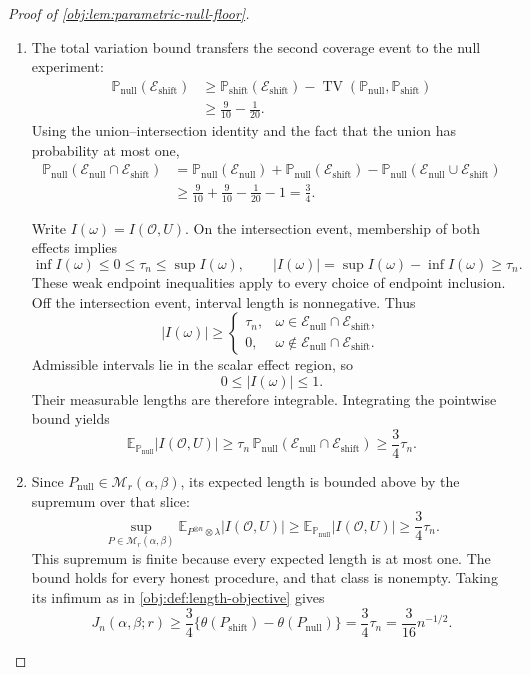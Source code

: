 \documentclass[11pt]{article}
\begin{document}
\begin{proof}[Proof of \cref{obj:lem:parametric-null-floor}]
\begin{enumerate}
\item The total variation bound transfers the second coverage event to the null experiment:
\[
\begin{aligned}
\mathbb P_{\mathrm{null}}(\mathcal E_{\mathrm{shift}})
&\ge
\mathbb P_{\mathrm{shift}}(\mathcal E_{\mathrm{shift}})
-
\operatorname{TV}
(\mathbb P_{\mathrm{null}},\mathbb P_{\mathrm{shift}})\\
&\ge\frac9{10}-\frac1{20}.
\end{aligned}
\]
Using the union--intersection identity and the fact that the union has probability at most one,
\[
\begin{aligned}
\mathbb P_{\mathrm{null}}
(\mathcal E_{\mathrm{null}}\cap\mathcal E_{\mathrm{shift}})
&=
\mathbb P_{\mathrm{null}}(\mathcal E_{\mathrm{null}})
+
\mathbb P_{\mathrm{null}}(\mathcal E_{\mathrm{shift}})
-
\mathbb P_{\mathrm{null}}
(\mathcal E_{\mathrm{null}}\cup\mathcal E_{\mathrm{shift}})\\
&\ge
\frac9{10}+\frac9{10}-\frac1{20}-1
=\frac34.
\end{aligned}
\]

Write \(I(\omega)=I(\mathcal O,U)\). On the intersection event, membership of both effects implies
\[
\inf I(\omega)\le0\le\tau_n\le\sup I(\omega),
\qquad
|I(\omega)|
=
\sup I(\omega)-\inf I(\omega)
\ge\tau_n.
\]
These weak endpoint inequalities apply to every choice of endpoint inclusion. Off the intersection event, interval length is nonnegative. Thus
\[
|I(\omega)|\ge
\begin{cases}
\tau_n,
&\omega\in\mathcal E_{\mathrm{null}}\cap\mathcal E_{\mathrm{shift}},\\
0,
&\omega\notin\mathcal E_{\mathrm{null}}\cap\mathcal E_{\mathrm{shift}}.
\end{cases}
\]
Admissible intervals lie in the scalar effect region, so
\[
0\le |I(\omega)|\le1.
\]
Their measurable lengths are therefore integrable. Integrating the pointwise bound yields
\[
\mathbb E_{\mathbb P_{\mathrm{null}}}|I(\mathcal O,U)|
\ge
\tau_n\,
\mathbb P_{\mathrm{null}}
(\mathcal E_{\mathrm{null}}\cap\mathcal E_{\mathrm{shift}})
\ge\frac34\tau_n.
\]

\item Since \(P_{\mathrm{null}}\in\mathcal M_r(\alpha,\beta)\), its expected length is bounded above by the supremum over that slice:
\[
\sup_{P\in\mathcal M_r(\alpha,\beta)}
\mathbb E_{P^{\otimes n}\otimes\lambda}|I(\mathcal O,U)|
\ge
\mathbb E_{\mathbb P_{\mathrm{null}}}|I(\mathcal O,U)|
\ge\frac34\tau_n.
\]
This supremum is finite because every expected length is at most one. The bound holds for every honest procedure, and that class is nonempty. Taking its infimum as in \cref{obj:def:length-objective} gives
\[
J_n(\alpha,\beta;r)
\ge
\frac34\{\theta(P_{\mathrm{shift}})-\theta(P_{\mathrm{null}})\}
=
\frac34\tau_n
=
\frac3{16}n^{-1/2}.
\]
\end{enumerate}
\end{proof}
\end{document}
